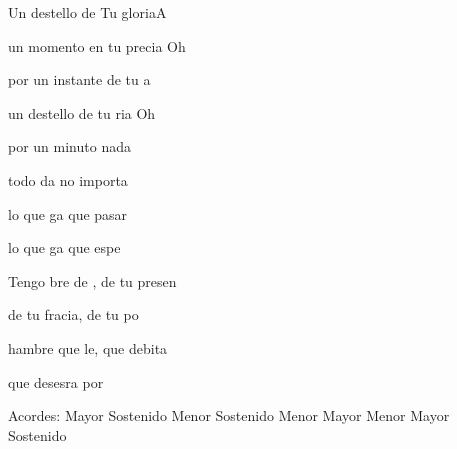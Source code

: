 \documentclass[12pt, spanish]{book}
\begin{document}
\begin{song}{Un destello de Tu gloria}{A}
        \begin{SBExtraKeys}{

            \begin{SBOpGroup}
                 un momento en tu precia Oh 

                por un instante de tu a

                 un destello de tu ria Oh 

                por un minuto nada 

                todo da no importa

                lo que ga que pasar

                lo que ga que espe
            \end{SBOpGroup}

            \begin{SBChorus}
                Tengo bre de , de tu presen

                de tu fracia, de tu po

                hambre que le, que debita

                que desesra por 
            \end{SBChorus}


            \ifChordBk
            \begin{SBOpGroup}
                Acordes:
                 Mayor \hfill
                 Sostenido Menor \hfill\null\break
                 Sostenido Menor \hfill
                 Mayor \hfill\null\break
                 Menor \hfill
                 Mayor \hfill\null\break
                 Sostenido \hfill\null\break
            \end{SBOpGroup}
            \fi
        }\end{SBExtraKeys}
    \end{song}
\end{document}
